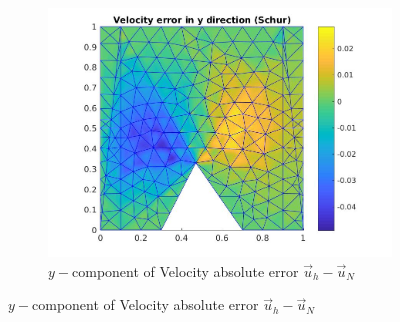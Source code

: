 \documentclass[graybox]{svmult}
\begin{document}
\begin{figure}[H]
\begin{subfigure}{0.31\textwidth}
\includegraphics[width=\linewidth]{velocity_error_2_at_47_33.jpg}
\caption{$y-$component of Velocity absolute error $\overrightarrow{u}_h-\overrightarrow{u}_N$} \label{error_y_vel}
\end{subfigure}


\end{figure}
\end{document}
